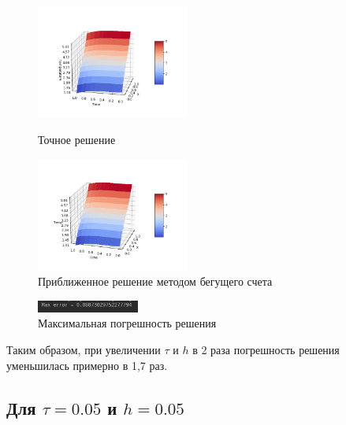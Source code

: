 \documentclass[12pt,a4paper]{scrartcl}
\begin{document}
\begin{figure}[h]
	\begin{multicols}{2}
		\hfill
		\includegraphics[width=50mm]{convect_equation/img/mainFunc10-10.png}
		\hfill
		\caption{Точное решение}
		\hfill
		\includegraphics[width=50mm]{convect_equation/img/result10-10.png}
		\hfill
		\caption{Приближенное решение методом бегущего счета}
	\end{multicols}
\end{figure}

\begin{figure}[h]
	\centering
	\includegraphics[width=0.3\textwidth]{convect_equation/img/MaxError10-10.png}
	\caption{Максимальная погрешность решения}
\end{figure}

\newpage
Таким образом, при увеличении $\tau$ и $h$ в 2 раза погрешность решения уменьшилась примерно в 1,7 раз.
	
\subsection{Для $\tau = 0.05$ и $h = 0.05$}
\end{document}
